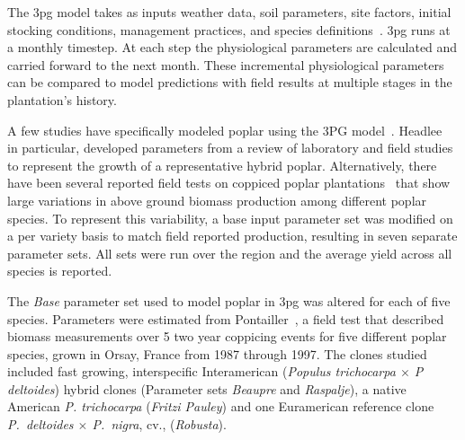 \documentclass[preprint,12pt]{elsarticle}
\begin{document}
The \ac{3pg} model takes as inputs weather data, soil parameters, site
factors, initial stocking conditions, management practices, and
species
definitions~\cite{landsberg2010physiological,Landsberg1997,Sands2004}.
\ac{3pg} runs at a monthly timestep. At each step the physiological
parameters are calculated and carried forward to the next month.
These incremental physiological parameters
can be compared to model predictions with field results at multiple
stages in the plantation's history.

A few studies have specifically modeled poplar using the 3PG
model~\cite{Amichev2010,Headlee2012,Zalesny2012}. Headlee~\cite{Headlee2012}
in particular, developed parameters from a review of laboratory and
field studies to represent the growth of a representative hybrid
poplar.  Alternatively, there have been several reported field tests
on coppiced poplar
plantations~\cite{Proe2002,Proe1999,Pontailler1999,Afas2008a} that
show large variations in above ground biomass production among
different poplar species.  To represent this variability, a base input
parameter set was modified on a per variety basis to match field
reported production, resulting in seven separate parameter sets.  All
sets were run over the region and the average yield across all
species is reported.

The \emph{Base} parameter set used to model poplar in \ac{3pg} was
altered for each of five species. Parameters were estimated from
Pontailler~\cite{Pontailler1999,pontailler97-volume-index,Ceulemans1993},
a field test that described biomass measurements over 5 two year
coppicing events for five different poplar species, grown in Orsay,
France from 1987 through 1997. The clones studied included fast
growing, interspecific Interamerican (\textit{Populus trichocarpa
  $\times$ P deltoides}) hybrid clones (Parameter sets \emph{Beaupre}
and \emph{Raspalje}), a native American \textit{P. trichocarpa}
(\emph{Fritzi Pauley}) and one Euramerican reference clone
\textit{P.~deltoides $\times$ P.~nigra}, cv., (\emph{Robusta}).
\end{document}
